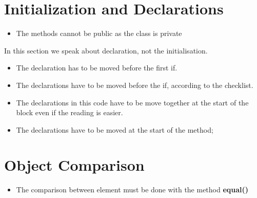 \section{Initialization and Declarations}
\begin{itemize}
    \begin{itemize}
      \item The methods
        cannot be public as the class is private
    \end{itemize}
    In this section we speak about declaration, not the initialisation.
    \begin{itemize}
      \item The declaration
        has to be moved before the first if.
      \item The declarations
        have to be moved before the if, according to the checklist.
      \item The declarations in this code
        have to be move together at the start of the block even if the reading is easier.
      \item The declarations
        have to be moved at the start of the method;
    \end{itemize}
\end{itemize}
\section{Object Comparison}
\begin{itemize}
    \begin{itemize}
      \item The comparison between element must be done with the method \textbf{equal()}
    \end{itemize}
\end{itemize}
